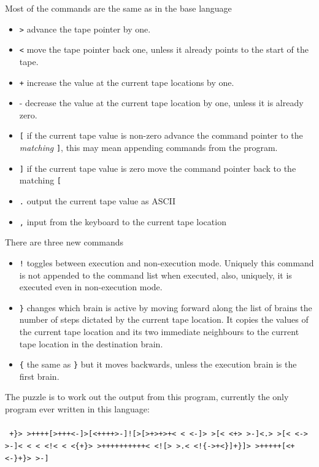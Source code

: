 \documentclass[12pt]{article}
\begin{document}
Most of the commands are the same as in the base language
\begin{itemize}
\item \texttt{>} advance the tape pointer by one.
\item \texttt{<} move the tape pointer back one, unless it already points to
  the start of the tape.
\item \texttt{+} increase the value at the current tape locations by one.
\item - decrease the value at the current tape location by one, unless it is already zero.
\item \texttt{[} if the current tape value is non-zero advance the command pointer to the \textsl{matching} \texttt{]}, this may mean appending commands from the program.
\item \texttt{]} if the current tape value is zero move the command pointer
  back to the matching \texttt{[}
\item \texttt{.} output the current tape value as ASCII
\item \texttt{,} input from the keyboard to the current tape location
\end{itemize}

There are three new commands
\begin{itemize}
\item \texttt{!} toggles between execution and non-execution mode. Uniquely
  this command is not appended to the command list when executed,
  also, uniquely, it is executed even in non-execution mode.
\item \texttt{\}} changes which brain is active by moving forward along the list of brains the number of steps dictated by the current tape location. It copies the values of the current tape location and its two immediate neighbours to the current tape location in the destination brain. 
\item \texttt{\{} the same as \texttt{\}} but it moves backwards, unless the execution brain is the first brain.
\end{itemize}

The puzzle is to work out the output from this program, currently the only program ever written in this language:\\
\\
\texttt{
+\}> >++++[>+++<-]>[<++++>-]![>[>+>+>+< < <-]> >[< <+> >-]<.> >[< <-> >-]< < < <!< < <\{+\}> >++++++++++< <![> >.< <!\{->+<\}]+\}]> >+++++[<+<-\}+\}>  >-]
}
 
\end{document}
